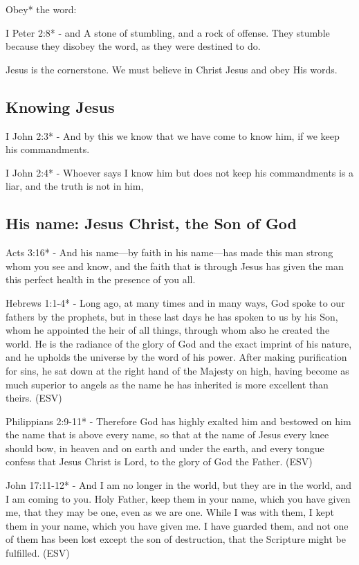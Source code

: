 \documentclass[11pt]{article}
\begin{document}
Obey* the word:

I Peter 2:8* - and A stone of stumbling, and a rock of offense. They stumble because they disobey the word, as they were destined to do.

Jesus is the cornerstone. We must believe in Christ Jesus and obey His words.

\subsection{Knowing Jesus}
\label{sec:org099fa0c}
I John 2:3* - And by this we know that we have come to know him, if we keep his commandments.

I John 2:4* - Whoever says I know him but does not keep his commandments is a liar, and the truth is not in him,

\subsection{His name: Jesus Christ, the Son of God}
\label{sec:org54a82f5}
Acts 3:16* - And his name—by faith in his name—has made this man strong whom you see and know, and the faith that is through Jesus has given the man this perfect health in the presence of you all.􀀁􃃨

Hebrews 1:1-4* -  Long ago, at many times and in many ways, God spoke to our fathers by the prophets, but in these last days he has spoken to us by his Son, whom he appointed the heir of all things, through whom also he created the world.  He is the radiance of the glory of God and the exact imprint of his nature, and he upholds the universe by the word of his power.  After making purification for sins, he sat down at the right hand of the Majesty on high, having become as much superior to angels as the name he has inherited is more excellent than theirs. (ESV)

Philippians 2:9-11* - Therefore God has highly exalted him and bestowed on him the name that is above every name, so that at the name of Jesus every knee should bow, in heaven and on earth and under the earth, and every tongue confess that Jesus Christ is Lord, to the glory of God the Father. (ESV)

John 17:11-12* -  And I am no longer in the world, but they are in the world, and I am coming to you.  Holy Father, keep them in your name, which you have given me, that they may be one, even as we are one.  While I was with them, I kept them in your name, which you have given me.  I have guarded them, and not one of them has been lost except the son of destruction, that the Scripture might be fulfilled. (ESV)
\end{document}
